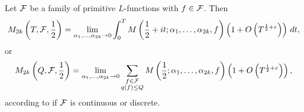   \begin{conjecture}
    Let $\mathcal{F}$ be a family of primitive $L$-functions with $f \in \mathcal{F}$. Then
    \[
      M_{2k}\left(T,\mathcal{F},\frac{1}{2}\right) = \lim_{\alpha_{1},\ldots,\alpha_{2k} \to 0}\int_{0}^{T}M\left(\frac{1}{2}+it;\alpha_{1},\ldots,\alpha_{2k},f\right)\left(1+O\left(T^{\frac{1}{2}+\varepsilon}\right)\right)\,dt,
    \]
    or
    \[
       M_{2k}\left(Q,\mathcal{F},\frac{1}{2}\right) = \lim_{\alpha_{1},\ldots,\alpha_{2k} \to 0}\sum_{\substack{f \in \mathcal{F} \\ q(f) \le Q}}M\left(\frac{1}{2};\alpha_{1},\ldots,\alpha_{2k},f\right)\left(1+O\left(T^{\frac{1}{2}+\varepsilon}\right)\right),
    \]
    according to if $\mathcal{F}$ is continuous or discrete.
  \end{conjecture}